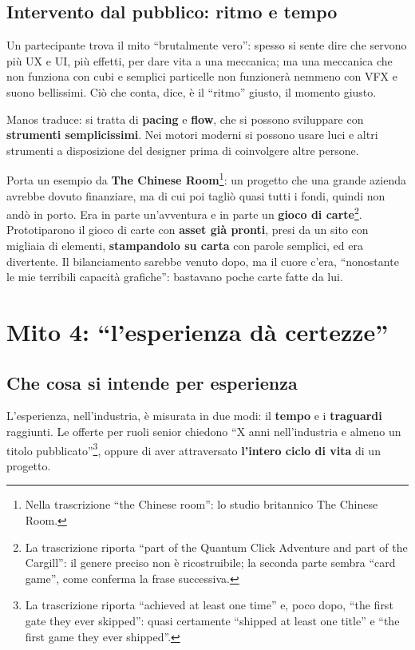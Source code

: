 \subsection{Intervento dal pubblico: ritmo e tempo}

Un partecipante trova il mito ``brutalmente vero'': spesso si sente dire che
servono più UX e UI, più effetti, per dare vita a una meccanica; ma una meccanica
che non funziona con cubi e semplici particelle non funzionerà nemmeno con VFX e
suono bellissimi. Ciò che conta, dice, è il ``ritmo'' giusto, il momento giusto.

Manos traduce: si tratta di \textbf{pacing} e \textbf{flow}, che si possono
sviluppare con \textbf{strumenti semplicissimi}. Nei motori moderni si possono usare
luci e altri strumenti a disposizione del designer prima di coinvolgere altre
persone.

Porta un esempio da \textbf{The Chinese Room}\footnote{Nella trascrizione ``the
Chinese room'': lo studio britannico The Chinese Room.}: un progetto che una grande
azienda avrebbe dovuto finanziare, ma di cui poi tagliò quasi tutti i fondi, quindi
non andò in porto. Era in parte un'avventura e in parte un \textbf{gioco di
carte}\footnote{La trascrizione riporta ``part of the Quantum Click Adventure and
part of the Cargill'': il genere preciso non è ricostruibile; la seconda parte
sembra ``card game'', come conferma la frase successiva.}. Prototiparono il gioco di
carte con \textbf{asset già pronti}, presi da un sito con migliaia di elementi,
\textbf{stampandolo su carta} con parole semplici, ed era divertente. Il
bilanciamento sarebbe venuto dopo, ma il cuore c'era, ``nonostante le mie terribili
capacità grafiche'': bastavano poche carte fatte da lui.

\section{Mito 4: ``l'esperienza dà certezze''}
\label{sec:c2-6-mito4}

\subsection{Che cosa si intende per esperienza}

L'esperienza, nell'industria, è misurata in due modi: il \textbf{tempo} e i
\textbf{traguardi} raggiunti. Le offerte per ruoli senior chiedono ``X anni
nell'industria e almeno un titolo pubblicato''\footnote{La trascrizione riporta
``achieved at least one time'' e, poco dopo, ``the first gate they ever skipped'':
quasi certamente ``shipped at least one title'' e ``the first game they ever
shipped''.}, oppure di aver attraversato \textbf{l'intero ciclo di vita} di un
progetto.


